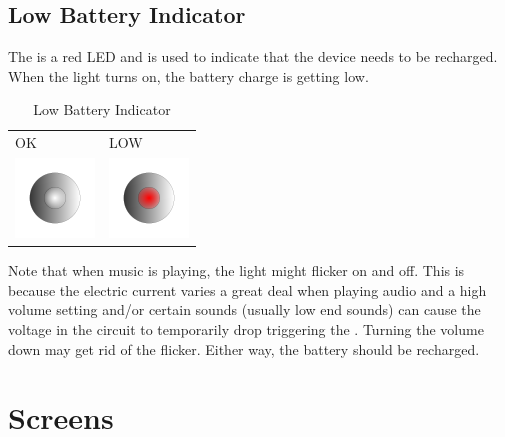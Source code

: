 \subsection{Low Battery Indicator} \label{Low Battery Indicator}

The  is a red LED and is used to indicate that the device needs to be
recharged.  When the light turns on, the battery charge is getting low.

\begin{table}[H]
\centering
\begin{tabu} to 6cm { X[1,c,m] X[1,c,m] }
  OK & LOW \\
  \includegraphics{images/lowbat_off.png}
    & \includegraphics{images/lowbat_on.png} \\
\end{tabu}
\caption{Low Battery Indicator}
\end{table}

Note that when music is playing, the light might flicker on and off. This is
because the electric current varies a great deal when playing audio and a high
volume setting and/or certain sounds (usually low end sounds) can cause the
voltage in the circuit to temporarily drop triggering the .  Turning
the volume down may get rid of the flicker.  Either way, the battery should
be recharged.

\section{Screens}

